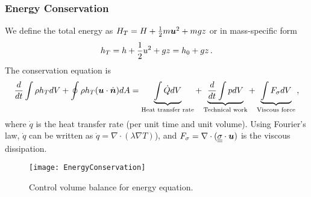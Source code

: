 \subsubsection{Energy Conservation}
We define the total energy as $H_T = H + {\frac{1}{2}}m{\mbox{\boldmath$u$}}^2+mgz$ or in mass-specific form
\begin{equation}
h_T = h + {\frac{1}{2}} u^2 + gz = h_0 + gz\,.
\end{equation}
The conservation equation is
\begin{equation}
  {\frac{d}{dt}} \int \rho h_T dV + \oint \rho h_T ({\mbox{\boldmath$u$}} \cdot \hat{{\mbox{\boldmath$n$}}})dA =  \underbrace{\int \dot{Q} dV}_\text{Heat transfer rate}+\underbrace{{\frac{d}{dt}}\int p dV}_\text{Technical work}+\underbrace{\int F_\sigma dV}_\text{Viscous force}\,,
\end{equation}
where $\dot{q}$ is the heat transfer rate (per unit time and unit volume). Using Fourier's law, $\dot{q}$ can be written as $\dot{q} = \nabla \cdot (\lambda \nabla T)$), and $F_\sigma = \nabla \cdot ({\underline{\underline{{\sigma}}}} \cdot {\mbox{\boldmath$u$}})$ is the viscous dissipation.

\begin{figure}[!h!]
  \begin{center}
    \texttt{[image: EnergyConservation]}
    \caption{\label{FIG_ENERGY_CONSERVATION}Control volume balance for energy equation.}
  \end{center}
\end{figure}

